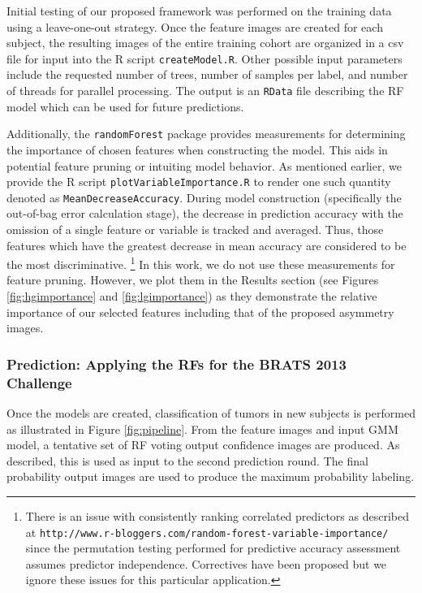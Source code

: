 \documentclass[preprint,authoryear,review,12pt]{elsarticle}
\begin{document}
Initial testing of our proposed framework was performed 
on the training data using a leave-one-out strategy.  Once the
feature images are created for each subject, the resulting images of the entire
training cohort are organized in a csv file for input into the R script
{\tt createModel.R}.  Other possible input parameters include the requested 
number of trees, number of samples per label, and number of threads for parallel
processing.  The output is an {\tt RData} file describing the RF
model which can be used for future predictions.
 
Additionally, the {\tt randomForest} package provides  measurements 
for determining the importance of chosen features when constructing the model.  
This aids in potential feature pruning or intuiting model behavior.  As mentioned
earlier, we provide the R script {\tt plotVariableImportance.R} to render
one such quantity denoted as {\tt MeanDecreaseAccuracy}.  During model construction
(specifically the out-of-bag error calculation stage), the decrease in prediction accuracy
with the omission of a single feature or variable is tracked and averaged.  Thus,
those features which have the greatest decrease in mean accuracy are considered
to be the most discriminative.%
\footnote{
There is an issue with consistently ranking correlated predictors as described at {\tt http://www.r-bloggers.com/random-forest-variable-importance/} since the permutation testing performed for predictive accuracy assessment assumes predictor independence.  Correctives have been proposed but we ignore these issues for this particular application.
}
In this work, we do not use these measurements for feature pruning.  However,
we plot them in the Results section (see Figures \ref{fig:hgimportance} and
\ref{fig:lgimportance}) as they demonstrate the relative importance of our
selected features including that of the proposed asymmetry images.

\subsubsection{Prediction:  Applying the RFs for the BRATS 2013 Challenge}

Once the models are created, classification of tumors in new subjects is performed
as illustrated in Figure \ref{fig:pipeline}.  From the feature images and input 
GMM model, a tentative set of RF voting output confidence images are produced.
As described, this is used as input to the second prediction round.  The 
final probability output images are used to produce the maximum probability labeling.  
\end{document}
